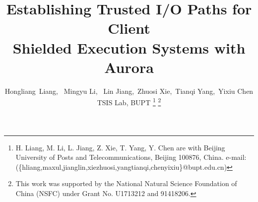 \documentclass[journal,twocolumn,letterpaper,10pt]{ieee-sty/IEEEtran}
\begin{document}


\title{ Establishing Trusted I/O Paths for Client \\ Shielded Execution Systems with Aurora }

\author{Hongliang~Liang,~
	Mingyu Li,%
	~Lin Jiang,~Zhuosi Xie,~Tianqi Yang,~Yixiu Chen\\
	TSIS Lab, BUPT
	\thanks{H. Liang, M. Li, L. Jiang, Z. Xie, T. Yang, Y. Chen 
  are with Beijing University of Posts and Telecommunications, Beijing 100876, China. e-mail: (\{hliang,maxul,jianglin,xiezhuosi,yangtianqi,chenyixiu\}@bupt.edu.cn)
  }%
	\thanks{This work was supported by the National Natural Science Foundation of China (NSFC) under Grant No. U1713212 and 91418206.}
}

\maketitle









\end{document}
